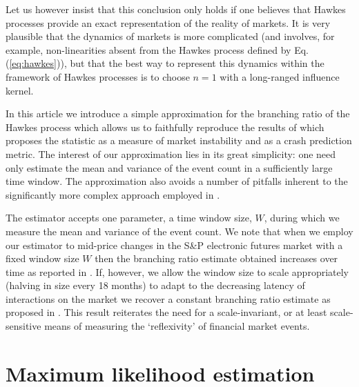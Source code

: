 \documentclass{article}
\begin{document}
Let us however insist that this conclusion only holds if one believes that
Hawkes processes provide an exact representation of the reality of markets. It
is very plausible that the dynamics of markets is more complicated (and
involves, for example, non-linearities absent from the Hawkes process defined
by Eq. (\ref{eq:hawkes})), but that the best way to represent this dynamics
within the framework of Hawkes processes is to choose $n = 1$ with a
long-ranged influence kernel.

In this article we introduce a simple approximation for the branching ratio of
the Hawkes process which allows us to faithfully reproduce the results of
{\cite{filimonov}} which proposes the statistic as a measure of market
instability and as a crash prediction metric. The interest of our
approximation lies in its great simplicity: one need only estimate the mean
and variance of the event count in a sufficiently large time window. The
approximation also avoids a number of pitfalls {\cite{apparentcriticality}}
inherent to the significantly more complex approach {\cite{ozaki}} employed in
{\cite{filimonov}}.

The estimator accepts one parameter, a time window size, $W$, during which we
measure the mean and variance of the event count. We note that when we employ
our estimator to mid-price changes in the S\&P electronic futures market with
a fixed window size $W$ then the branching ratio estimate obtained increases
over time as reported in {\cite{filimonov}}. If, however, we allow the window
size to scale appropriately (halving in size every 18 months) to adapt to the
decreasing latency of interactions on the market we recover a constant
branching ratio estimate as proposed in {\cite{criticalreflexivity}}. This
result reiterates the need for a scale-invariant, or at least scale-sensitive
means of measuring the `reflexivity' of financial market events.

\section{Maximum likelihood estimation}
\end{document}
